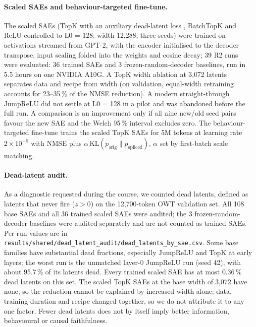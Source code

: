 \paragraph{Scaled SAEs and behaviour-targeted fine-tune.} The scaled SAEs (TopK with an auxiliary dead-latent loss
\citep{gao2024scaling}, BatchTopK \citep{bussmann2024batchtopk} and ReLU controlled to L0 = 128; width 12{,}288; three
seeds) were trained on activations streamed from GPT-2, with the encoder initialised to the decoder transpose, input
scaling folded into the weights and cosine decay; 39 R2 runs were evaluated: 36 trained SAEs and 3
frozen-random-decoder baselines, run in 5.5 hours on one NVIDIA A10G. A TopK width
ablation at 3{,}072 latents separates data and recipe from width (on validation, equal-width retraining accounts for
23--35\,\% of the NMSE reduction). A modern straight-through JumpReLU did not settle at L0 = 128 in a pilot and was
abandoned before the full run. A comparison is an improvement only if all nine new/old seed pairs favour the new SAE and
the Welch 95\,\% interval excludes zero. The behaviour-targeted fine-tune trains the scaled TopK SAEs for 5M tokens at
learning rate $2\times10^{-5}$ with NMSE plus $\alpha\,\mathrm{KL}(p_{\text{orig}}\|p_{\text{spliced}})$, $\alpha$ set by
first-batch scale matching.

\paragraph{Dead-latent audit.} As a diagnostic requested during the course, we counted dead latents, defined as
latents that never fire ($z>0$) on the 12{,}700-token OWT validation set. All 108 base SAEs and all 36 trained scaled
SAEs were audited; the 3 frozen-random-decoder baselines were audited separately and are not counted as trained SAEs.
Per-run values are in \nolinkurl{results/shared/dead_latent_audit/dead_latents_by_sae.csv}. Some base families have
substantial dead fractions, especially JumpReLU and TopK at early layers; the worst run is the unmatched layer-0
JumpReLU run (seed 42), with about 95.7\,\% of its latents dead. Every trained scaled SAE has at most 0.36\,\% dead
latents on this set. The scaled TopK SAEs at the base width of 3{,}072 have none, so the reduction cannot be explained
by increased width alone; data, training duration and recipe changed together, so we do not attribute it to any one
factor. Fewer dead latents does not by itself imply better information, behavioural or causal faithfulness.

